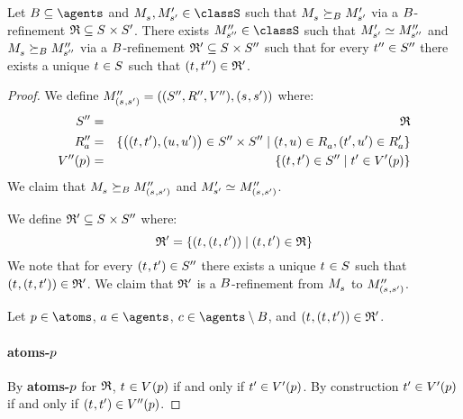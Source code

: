 \begin{lemma}\label{refinement-functional}
Let $\agentsB \subseteq \agents$ and $\kPModel{\kStateS}, \kPModelP{\kStateSP} \in \classS$ such that $\kPModel{\kStateS} \simulatesBs \kPModelP{\kStateSP}$ via a $B$-refinement $\refinement \subseteq \kStates \times \kStatesP$.
There exists $\kPModelPP{\kStateSPP} \in \classS$ such that $\kPModelP{\kStateSP} \bisimilar \kPModelPP{\kStateSPP}$ and $\kPModel{\kStateS} \simulatesBs \kPModelPP{\kStateSPP}$ via a $B$-refinement $\refinement' \subseteq \kStates \times \kStatesPP$ such that for every ${t}^{\prime\prime} \in {S^{\prime\prime}}$ there exists a unique $\kStateT \in \kStates$ such that $(\kStateT, \kStateTPP) \in \refinement'$.
\end{lemma}

\begin{proof}
We define $\kPModelAndTuplePP{(\kStateS, \kStateSP)}$ where:
\begin{eqnarray*}
    \kStatesPP &=& \refinement\\
    \kAccessibilityPPA &=& \{\big((\kStateT, \kStateTP), (\kStateU, \kStateUP)\big) \in \kStatesPP \times \kStatesPP \mid (\kStateT, \kStateU) \in \kAccessibilityA, (\kStateTP, \kStateUP) \in \kAccessibilityPA\}\\
    \kValuationPP(\atomP) &=& \{(\kStateT, \kStateTP) \in \kStatesPP \mid \kStateTP \in \kValuationP(\atomP)\}
\end{eqnarray*}
We claim that $\kPModel{\kStateS} \simulatesBs \kPModelPP{(\kStateS, \kStateSP)}$ and $\kPModelP{\kStateSP} \bisimilar \kPModelPP{(\kStateS, \kStateSP)}$.

We define $\refinement' \subseteq \kStates \times \kStatesPP$ where:
$$
\refinement' = \{(\kStateT, (\kStateT, \kStateTP)) \mid (\kStateT, \kStateTP) \in \refinement\}
$$
We note that for every $(\kStateT, \kStateTP) \in \kStatesPP$ there exists a unique $\kStateT \in \kStates$ such that $(\kStateT, (\kStateT, \kStateTP)) \in \refinement'$.
We claim that $\mathfrak{R}'$ is a $B$-refinement from $\kPModel{\kStateS}$ to $\kPModelPP{(\kStateS, \kStateSP)}$.

Let $\atomP \in \atoms$, $\agentA \in \agents$, $\agentC \in \agents \setminus \agentsB$, and $(\kStateT, (\kStateT, \kStateTP)) \in \refinement'$.

\paragraph{atoms-$p$}
By {\bf atoms-$p$} for $\mathfrak{R}$, $\kStateT \in \kValuation(\atomP)$ if and only if ${t}^{\prime} \in {V^{\prime}}(p)$.
By construction ${t}^{\prime} \in {V^{\prime}}(p)$ if and only if $(\kStateT, \kStateTP) \in \kValuationPP(\atomP)$.


\end{proof}
